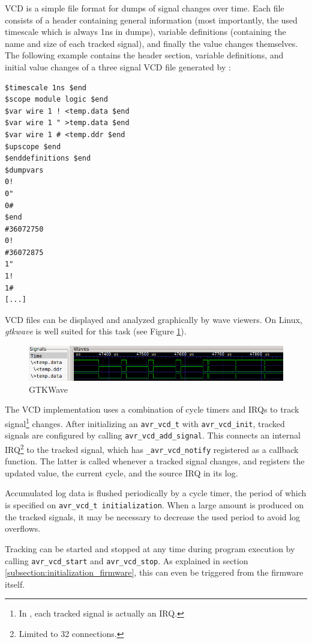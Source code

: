 \ac{VCD} is a simple file format for dumps of signal changes over time. Each file
consists of a header containing general information (most importantly, the
used timescale which is always 1ns in \simavr dumps), variable definitions
(containing the name and size of each tracked signal), and finally the value
changes themselves. The following example contains the header section, variable
definitions, and initial value changes of a three signal \ac{VCD} file generated
by \simavr:

\begin{verbatim}
$timescale 1ns $end
$scope module logic $end
$var wire 1 ! <temp.data $end
$var wire 1 " >temp.data $end
$var wire 1 # <temp.ddr $end
$upscope $end
$enddefinitions $end
$dumpvars
0!
0"
0#
$end
#36072750
0!
#36072875
1"
1!
1#
[...]
\end{verbatim}


\ac{VCD} files can be displayed and analyzed graphically by wave viewers. On Linux,
\emph{gtkwave} is well suited for this task (see Figure \ref{fig:gtkwave}).

\begin{figure}
\includegraphics[width=\textwidth]{images/gtkwave}
\caption{GTKWave}
\label{fig:gtkwave}
\end{figure}

The \simavr \ac{VCD} implementation uses a combination of cycle timers
and \acp{IRQ} to track signal\footnote{
%
In \simavr, each tracked signal is actually an \ac{IRQ}.
%
} changes. After initializing an \lstinline|avr_vcd_t|
with \lstinline|avr_vcd_init|, tracked signals are configured by calling
\lstinline|avr_vcd_add_signal|. This connects an internal \ac{IRQ}\footnote{
Limited to 32 connections.} to the tracked signal, which has
\lstinline|_avr_vcd_notify| registered as a callback function. The latter is
called whenever a tracked signal changes, and registers the updated value, the
current cycle, and the source \ac{IRQ} in its log.

Accumulated log data is flushed periodically by a cycle timer, the period of
which is specified on \lstinline|avr_vcd_t initialization|. When a large amount
is produced on the tracked signals, it may be necessary to decrease the used
period to avoid log overflows.

Tracking can be started and stopped at any time during program execution by
calling \lstinline|avr_vcd_start| and \lstinline|avr_vcd_stop|. As explained in
section \ref{subsection:initialization_firmware}, this can even be triggered from the
firmware itself.


